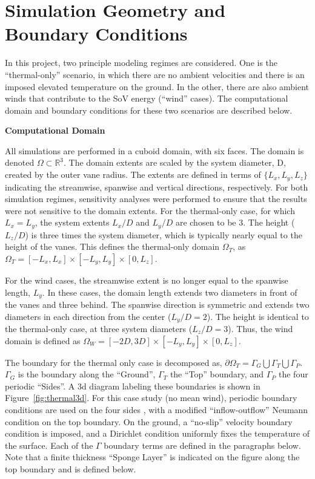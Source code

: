 
\section{Simulation Geometry and Boundary Conditions}
\label{sec:bc}

In this project, two principle modeling regimes are considered. 
One is the ``thermal-only'' scenario, in which there are no ambient
velocities and there is an imposed elevated temperature on the ground.  
In the other, there are also ambient winds that contribute to the SoV energy
(``wind'' cases). 
The computational domain and boundary conditions for these 
two scenarios are described below.

\textbf{Computational Domain} 

All simulations are performed in a cuboid domain, with six
faces.  The domain is denoted $\Omega \subset \mathbb{R}^3$. 
The domain extents are scaled by the system diameter, D, created by the
outer vane radius. The extents are defined in terms of $\{L_x,L_y,L_z\}$ indicating the 
streamwise, spanwise and vertical directions, respectively. 
For both simulation regimes, sensitivity analyses 
were performed to ensure that the results were not sensitive 
to the domain extents. For the thermal-only case, for which $L_x = L_y$,
the system 
extents $L_x/D$ and $L_y/D$ are chosen to be 3. The height ($L_z/D$) is
three times the system diameter, which is typically nearly equal to the
height of the vanes. This defines the thermal-only domain $\Omega_T$, 
as $\Omega_T = \left[-L_x,L_x \right] \times \left[-L_y,L_y \right]
\times \left[0,L_z \right]$.   

For the wind cases, the streamwise extent is no longer equal to
the spanwise length, $L_y$. In these cases, the domain length extends
two diameters in front of the vanes and three behind. The
spanwise direction is symmetric and extends two diameters in each direction 
from the center ($L_y/D = 2$). The height is identical to the
thermal-only case, at three system diameters ($L_z/D = 3$). Thus, the
wind domain is defined as $\Omega_W = \left[-2D,3D \right] \times
\left[-L_y,L_y \right] \times \left[0,L_z \right]$.   

The boundary for the thermal only case is decomposed as,
$\partial \Omega_T = \Gamma_G \bigcup \Gamma_T \bigcup \Gamma_P $. 
$\Gamma_G$ is the boundary along the ``Ground'', $\Gamma_T$
the ``Top'' boundary, and $\Gamma_P$ the four periodic ``Sides''. A 3d
diagram labeling these boundaries is shown in
Figure~\ref{fig:thermal3d}. For this case study (no mean wind),
periodic boundary conditions are used on the four sides , with a modified 
``inflow-outflow'' Neumann condition\cite{gunzburger1989finite} on the
top boundary. On the ground, a ``no-slip'' velocity boundary condition is
imposed, and a Dirichlet condition uniformly fixes
the temperature of the surface. 
Each of the $\Gamma$ boundary terms are defined in the paragraphs below. 
Note that a finite thickness ``Sponge Layer'' is
indicated on the figure along the top boundary and is defined below. 

